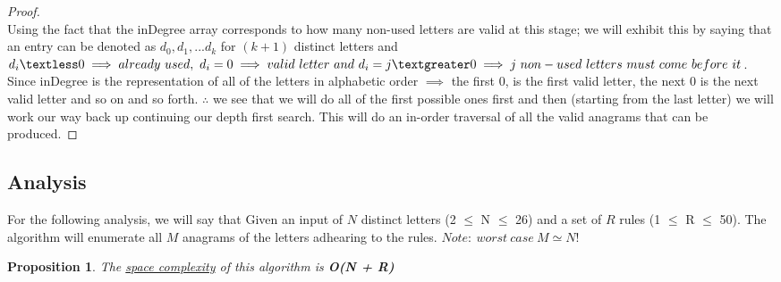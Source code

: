 \documentclass[12pt]{article}
\newtheorem{proposition}[theorem]{Proposition}
\begin{document}
\begin{proof}
~ \\ \indent Using the fact that the inDegree array corresponds to how many non-used
letters are valid at this stage; we will exhibit this by saying that an entry can be denoted as $d_0,d_1,...d_k$ for $(k+1)$
distinct letters and $d_i \textless 0 \implies already\ used,\ d_i = 0 \implies valid\ letter\ and\ d_i = j \textgreater
0 \implies j\ non-used\ letters\ must\ come\ before\ it$. Since inDegree is the representation of all of the letters
in alphabetic order $\implies$ the first 0, is the first valid letter, the next 0 is the next valid letter and so on and
so forth. $\therefore$ we see that we will do all of the first possible ones first and then (starting from the last letter)
we will work our way back up continuing our depth first search.  This will do an in-order traversal of all the valid anagrams
that can be produced.
\end{proof}


\subsection{Analysis}
For the following analysis, we will say that Given an input of $N$ distinct letters (2 $\leq$ N $\leq$ 26) and a set of
$R$ rules (1 $\leq$ R $\leq$ 50). The algorithm will enumerate all $M$ anagrams of the letters adhearing to the rules.
$Note:\ worst\ case\ M \simeq N!$

\begin{proposition}
\label{numq}
The \underline{space complexity} of this algorithm is \textbf{O(N + R)}
\end{proposition}
\end{document}
